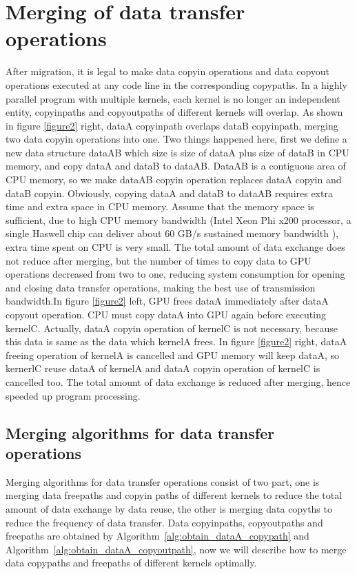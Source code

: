 \documentclass[10pt,conference]{IEEEtran}
\begin{document}
\section{Merging of data transfer operations}
After migration, it is legal to make data copyin operations and data copyout operations executed at any code line in the corresponding copypaths. In a highly parallel program with multiple kernels, each kernel is no longer an independent entity, copyinpaths and copyoutpaths of different kernels will overlap. As shown in figure \ref{figure2} right, dataA copyinpath overlaps dataB copyinpath, merging two data copyin operations into one. Two things happened here, first we define a new data structure dataAB which size is size of dataA plus size of dataB in CPU memory, and copy dataA and dataB to dataAB. DataAB is a contiguous area of CPU memory, so we make dataAB copyin operation replaces dataA copyin and dataB copyin. Obviously, copying dataA and dataB to dataAB requires extra time and extra space in CPU memory. Assume that the memory space is sufficient, due to high CPU memory bandwidth (Intel Xeon Phi x200 processor, a single Haswell chip can deliver about 60 GB/s sustained memory bandwidth \cite{IEEEhowto:14}\cite{IEEEhowto:15}), extra time spent on CPU is very small. The total amount of data exchange does not reduce after merging, but the number of times to copy data to GPU operations decreased from two to one, reducing system consumption for opening and closing data transfer operations, making the best use of transmission bandwidth.In figure \ref{figure2} left, GPU frees dataA immediately after dataA copyout operation. CPU must copy dataA into GPU again before executing kernelC. Actually, dataA copyin operation of kernelC is not necessary, because this data is same as the data which kernelA frees. In figure \ref{figure2} right, dataA freeing operation of kernelA is cancelled and GPU memory will keep dataA, so kernerlC reuse dataA of kernelA and dataA copyin operation of kernelC is cancelled too. The total amount of data exchange is reduced after merging, hence speeded up program processing.

\subsection{Merging algorithms for data transfer operations}
Merging algorithms for data transfer operations consist of two part, one is merging data freepaths and copyin paths of different kernels to reduce the total amount of data exchange by data reuse, the other is merging data copyths to reduce the frequency of data transfer. Data copyinpaths, copyoutpaths and freepaths are obtained by Algorithm~\ref{alg:obtain_dataA_copypath} and Algorithm~\ref{alg:obtain_dataA_copyoutpath}, now we will describe how to merge data copypaths and freepaths of different kernels optimally.
\end{document}

